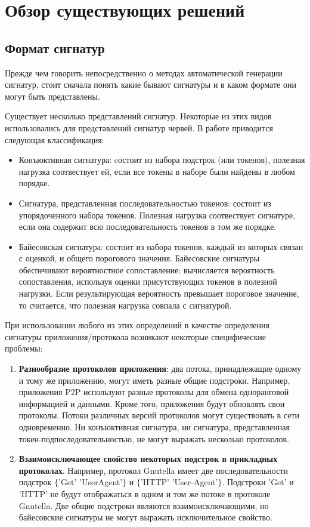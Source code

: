 \section{Обзор существующих решений}
\label{sec:Section2} 

\subsection{Формат сигнатур}

Прежде чем говорить непосредственно о методах автоматической генерации сигнатур, стоит сначала понять какие бывают сигнатуры и в каком формате они могут быть представлены.

Существует несколько представлений сигнатур. Некоторые из этих видов использовались для представлений сигнатур червей.
В работе \cite{newsome2005polygraph} приводится следующая классификация:

\begin{itemize}
    \item Конъюктивная сигнатура: cостоит из набора подстрок (или токенов), полезная нагрузка соотвествует ей, если все токены в наборе были найдены в любом порядке.
    \item Сигнатура, представленная последовательностью токенов: состоит из упорядоченного набора токенов.
    Полезная нагрузка соотвествует сигнатуре, если она содержит всю последовательность токенов в том же порядке.
    \item Байесовская сигнатура: состоит из набора токенов, каждый из которых связан с оценкой, и общего порогового значения.
    Байесовские сигнатуры обеспечивают вероятностное сопоставление: вычисляется вероятность сопоставления, используя оценки присутствующих токенов в полезной нагрузки.
    Если результирующая вероятность превышает пороговое значение, то считается, что полезная нагрузка совпала с сигнатурой.
\end{itemize}

При использовании любого из этих определений в качестве определения сигнатуры приложения/протокола возникают некоторые специфические проблемы:

\begin{enumerate}
    \item \textbf{Разнообразие протоколов приложения}: два потока, принадлежащие одному и тому же приложению, могут иметь разные общие подстроки.
    Например, приложения P2P используют разные протоколы для обмена одноранговой информацией и данными. Кроме того, приложения будут обновлять свои протоколы.
    Потоки различных версий протоколов могут существовать в сети одновременно.
    Ни конъюктивная сигнатура, ни сигнатура, представленная токен-подпоследовательностью, не могут выражать несколько протоколов.
    \item \textbf{Взаимоисключающее свойство некоторых подстрок в прикладных протоколах}.
    Например, протокол Gnutella имеет две последовательности подстрок $\{$'Get' 'UserAgent'$\}$ и $\{$'HTTP' 'User-Agent'$\}$.
    Подстроки 'Get' и 'HTTP' не будут отображаться в одном и том же потоке в протоколе Gnutella.
    Две общие подстроки являются взаимоисключающими, но байесовские сигнатуры не могут выражать исключительное свойство.
\end{enumerate}

